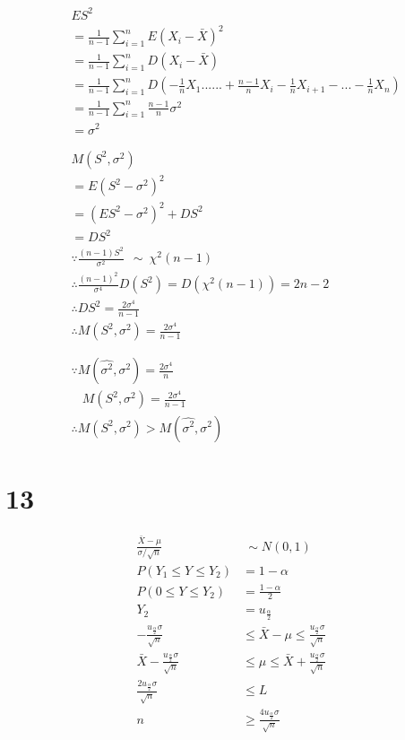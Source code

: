 \documentclass[a4paper,twocolumn]{ctexart}
\begin{document}
\begin{align*}
&ES^2\\
&=\frac{1}{n-1}\sum_{i=1}^{n}E(X_i-\bar{X})^2\\
&=\frac{1}{n-1}\sum_{i=1}^{n}D(X_i-\bar{X})\\
&=\frac{1}{n-1}\sum_{i=1}^{n}D(-\frac{1}{n}X_1......+\frac{n-1}{n}X_i-\frac{1}{n}X_{i+1}-...-\frac{1}{n}X_n)\\
&=\frac{1}{n-1}\sum_{i=1}^{n}\frac{n-1}{n}\sigma^2\\
&=\sigma^2\\
\\
\\
&M(S^2,\sigma^2)\\
&=E(S^2-\sigma^2)^2\\
&=(ES^2-\sigma^2)^2+DS^2\\
&=DS^2\\
&\because  \frac{(n-1)S^2}{\sigma^2}~~\sim~\chi^2(n-1)\\
&\therefore \frac{(n-1)^2}{\sigma^4}D(S^2)=D(\chi^2(n-1))=2n-2\\
&\therefore DS^2=\frac{2\sigma^4}{n-1}\\
&\therefore M(S^2,\sigma^2)=\frac{2\sigma^4}{n-1}\\
\\
\\
&\because M(\hat{\sigma^2},\sigma^2)=\frac{2\sigma^4}{n}\\
&~~~~M(S^2,\sigma^2)=\frac{2\sigma^4}{n-1}\\
&\therefore M(S^2,\sigma^2)>M(\hat{\sigma^2},\sigma^2)
\end{align*}
\section*{13}
\begin{align*}
\frac{\bar{X}-\mu}{\sigma/\sqrt{n}}&~\sim N(0,1)\\
P(Y_1\le Y\le Y_2)&=1-\alpha\\
P(0\le Y\le Y_2)&=\frac{1-\alpha}{2}\\
Y_2&=u_{\frac{\alpha}{2}}\\
-\frac{u_{\frac{\alpha}{2}}\sigma}{\sqrt{n}}&\le \bar{X}-\mu\le \frac{u_{\frac{\alpha}{2}}\sigma}{\sqrt{n}}\\
\bar{X}-\frac{u_{\frac{\alpha}{2}}\sigma}{\sqrt{n}}&\le \mu \le \bar{X}+\frac{u_{\frac{\alpha}{2}}\sigma}{\sqrt{n}}\\
\frac{2u_{\frac{\alpha}{2}}\sigma}{\sqrt{n}}&\le L\\
n&\ge \frac{4u_{\frac{\alpha}{2}}\sigma}{\sqrt{n}}
\end{align*}
\end{document}
